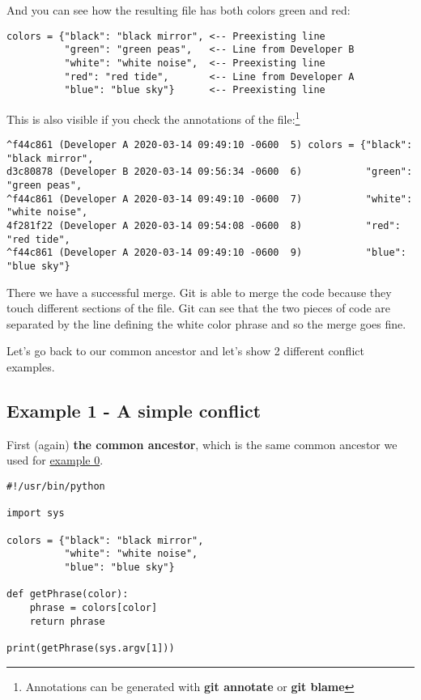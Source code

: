 And you can see how the resulting file has both colors green and red:
\begin{lstlisting}[style=code_section_style, firstnumber=5, caption={\bf Example 0} - colors section]
colors = {"black": "black mirror", <-- Preexisting line
          "green": "green peas",   <-- Line from Developer B
          "white": "white noise",  <-- Preexisting line
          "red": "red tide",       <-- Line from Developer A
          "blue": "blue sky"}      <-- Preexisting line
\end{lstlisting}

This is also visible if you check the annotations of the file:\footnote{Annotations can be generated with
{\bf git annotate} or {\bf git blame}}

\begin{lstlisting}[style=console_style, basicstyle=\tiny, caption={\bf Example 0} - annotations]
^f44c861 (Developer A 2020-03-14 09:49:10 -0600  5) colors = {"black": "black mirror",
d3c80878 (Developer B 2020-03-14 09:56:34 -0600  6)           "green": "green peas",
^f44c861 (Developer A 2020-03-14 09:49:10 -0600  7)           "white": "white noise",
4f281f22 (Developer A 2020-03-14 09:54:08 -0600  8)           "red": "red tide",
^f44c861 (Developer A 2020-03-14 09:49:10 -0600  9)           "blue": "blue sky"}
\end{lstlisting}

There we have a successful merge. Git is able to merge the code because they touch different sections of the file.
Git can see that the two pieces of code are separated by the line defining the white color phrase and so the merge
goes fine.

Let's go back to our common ancestor and let's show 2 different conflict examples.
\subsection{Example 1 - A simple conflict}
\label{example_01}

First (again) {\bf the common ancestor}, which is the same common ancestor we used for \hyperref[example_00]{example 0}.
\begin{lstlisting}[style=python_style, caption={\bf Example 1} - common ancestor]
#!/usr/bin/python

import sys

colors = {"black": "black mirror",
          "white": "white noise",
          "blue": "blue sky"}

def getPhrase(color):
    phrase = colors[color]
    return phrase

print(getPhrase(sys.argv[1]))
\end{lstlisting}

